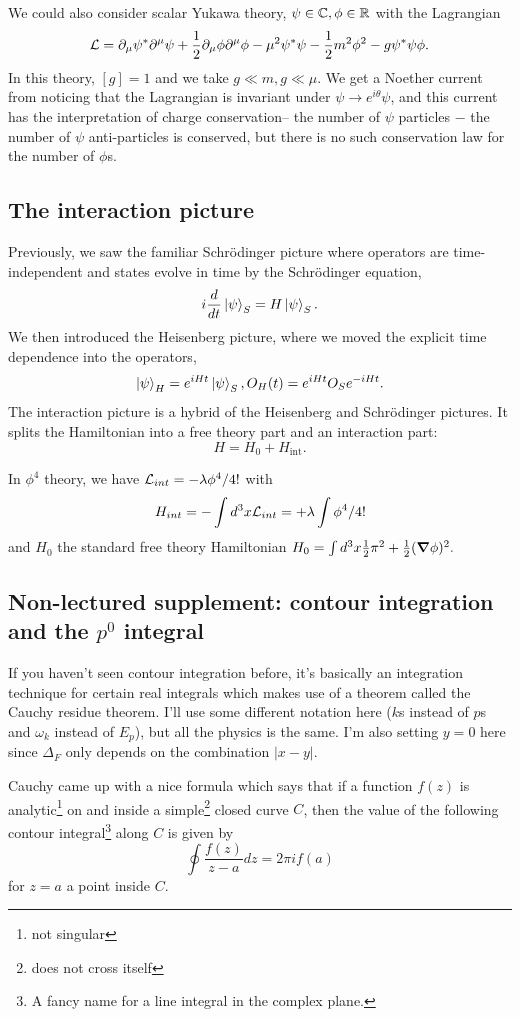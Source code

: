 \begin{exm}
We could also consider scalar Yukawa theory, $\psi\in \mathbb{C},\phi \in \mathbb{R}$ with the Lagrangian
$$\mathcal L=\partial_\mu \psi^* \partial^\mu \psi +\frac{1}{2}\partial_\mu \phi \partial^\mu \phi - \mu^2 \psi^*\psi -\frac{1}{2}m^2 \phi^2 - g\psi^* \psi \phi.$$
In this theory, $[g]=1$ and we take $g\ll m, g\ll \mu$. We get a Noether current from noticing that the Lagrangian is invariant under $\psi\to e^{i\theta}\psi$, and this current has the interpretation of charge conservation-- the number of $\psi$ particles $-$ the number of $\psi$ anti-particles is conserved, but there is no such conservation law for the number of $\phi$s.
\end{exm}

\subsection*{The interaction picture} Previously, we saw the familiar Schr\"odinger picture where operators are time-independent and states evolve in time by the Schr\"odinger equation,
$$i \frac{d}{dt}\left| \psi \right>_S=H\left| \psi \right>_S.$$
We then introduced the Heisenberg picture, where we moved the explicit time dependence into the operators,
$$\left| \psi \right>_H = e^{iHt}\left| \psi \right>_S, O_H(t)=e^{iHt} O_S e^{-iHt}.$$
The interaction picture is a hybrid of the Heisenberg and Schr\"odinger pictures. It splits the Hamiltonian into a free theory part and an interaction part:
$$H=H_0+H_{\text{int}}.$$
\begin{exm}
In $\phi^4$ theory, we have $\mathcal L_{int}=-\lambda \phi^4/4!$ with $$H_{int}=-\int d^3x \mathcal L_{int}=+\lambda \int \phi^4/4!$$
and $H_0$ the standard free theory Hamiltonian
$H_0=\int d^3x \frac{1}{2}\pi^2+\frac{1}{2}(\mbox{\boldmath$ \nabla $} \phi)^2.$
\end{exm}

\subsection*{Non-lectured supplement: contour integration and the $p^0$ integral}
If you haven't seen contour integration before, it's basically an integration technique for certain real integrals which makes use of a theorem called the Cauchy residue theorem. I'll use some different notation here ($k$s instead of $p$s and $\omega_k$ instead of $E_p$), but all the physics is the same. I'm also setting $y=0$ here since $\Delta_F$ only depends on the combination $|x-y|$.

Cauchy came up with a nice formula which says that if a function $f(z)$ is analytic\footnote{not singular} on and inside a simple\footnote{does not cross itself} closed curve $C$, then the value of the following contour integral\footnote{A fancy name for a line integral in the complex plane.} along $C$ is given by
$$\oint \frac{f(z)}{z-a}dz = 2\pi i f(a)$$
for $z=a$ a point inside $C$.

